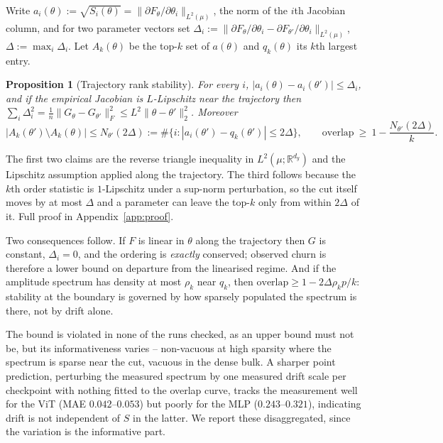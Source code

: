 \documentclass{article}
\newtheorem{proposition}{Proposition}
\begin{document}
Write $a_i(\theta):=\sqrt{S_i(\theta)}=\|\partial F_\theta/\partial\theta_i\|_{L^2(\mu)}$,
the norm of the $i$th Jacobian column, and for two parameter vectors set
$\Delta_i:=\|\partial F_{\theta}/\partial\theta_i-\partial F_{\theta'}/\partial\theta_i\|_{L^2(\mu)}$,
$\Delta:=\max_i\Delta_i$. Let $A_k(\theta)$ be the top-$k$ set of $a(\theta)$ and
$q_k(\theta)$ its $k$th largest entry.

\begin{proposition}[Trajectory rank stability]
\label{prop:stability}
For every $i$, $|a_i(\theta)-a_i(\theta')|\le\Delta_i$, and if the empirical Jacobian is
$L$-Lipschitz near the trajectory then
$\sum_i\Delta_i^2=\tfrac1n\|G_\theta-G_{\theta'}\|_F^2\le L^2\|\theta-\theta'\|_2^2$.
Moreover
\begin{equation}
  \big|A_k(\theta')\setminus A_k(\theta)\big|
  \le N_{\theta'}(2\Delta):=\#\{i:|a_i(\theta')-q_k(\theta')|\le 2\Delta\},
  \qquad
  \text{overlap}\ \ge\ 1-\frac{N_{\theta'}(2\Delta)}{k}.
\end{equation}
\end{proposition}

The first two claims are the reverse triangle inequality in $L^2(\mu;\mathbb R^{d_y})$ and
the Lipschitz assumption applied along the trajectory. The third follows because the $k$th
order statistic is $1$-Lipschitz under a sup-norm perturbation, so the cut itself moves by
at most $\Delta$ and a parameter can leave the top-$k$ only from within $2\Delta$ of it.
Full proof in Appendix~\ref{app:proof}.

Two consequences follow. If $F$ is linear in $\theta$ along the trajectory then $G$ is
constant, $\Delta_i=0$, and the ordering is \emph{exactly} conserved; observed churn is
therefore a lower bound on departure from the linearised regime. And if the amplitude
spectrum has density at most $\rho_k$ near $q_k$, then
$\text{overlap}\ge 1-2\Delta\rho_k p/k$: stability at the boundary is governed by how
sparsely populated the spectrum is there, not by drift alone.

The bound is violated in none of the runs checked, as an upper bound must not be, but its
informativeness varies -- non-vacuous at high sparsity where the spectrum is sparse near
the cut, vacuous in the dense bulk. A sharper point prediction, perturbing the measured
spectrum by one measured drift scale per checkpoint with nothing fitted to the overlap
curve, tracks the measurement well for the ViT (MAE $0.042$--$0.053$) but poorly for the
MLP ($0.243$--$0.321$), indicating drift is not independent of $S$ in the latter. We report
these disaggregated, since the variation is the informative part.
\end{document}

